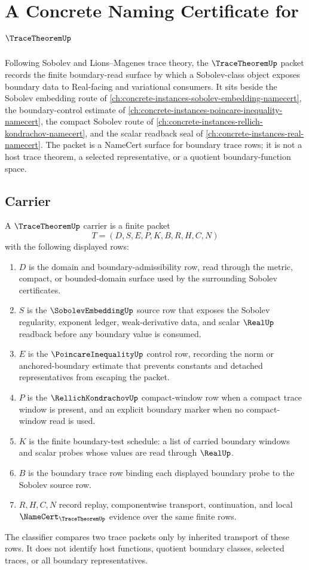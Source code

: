 \chapter{A Concrete Naming Certificate for $\TraceTheoremUp$}
\label{ch:concrete-instances-trace-theorem-namecert}

Following Sobolev and Lions--Magenes trace theory, the $\TraceTheoremUp$ packet records the finite boundary-read surface by which a Sobolev-class object exposes boundary data to Real-facing and variational consumers. It sits beside the Sobolev embedding route of \autoref{ch:concrete-instances-sobolev-embedding-namecert}, the boundary-control estimate of \autoref{ch:concrete-instances-poincare-inequality-namecert}, the compact Sobolev route of \autoref{ch:concrete-instances-rellich-kondrachov-namecert}, and the scalar readback seal of \autoref{ch:concrete-instances-real-namecert}. The packet is a NameCert surface for boundary trace rows; it is not a host trace theorem, a selected representative, or a quotient boundary-function space.

\section{Carrier}
\label{sec:trace-theorem-carrier}

\begin{definition}
\label{def:trace-theorem-carrier}
A $\TraceTheoremUp$ carrier is a finite packet
$$
T=(D,S,E,P,K,B,R,H,C,N)
$$
with the following displayed rows:
\begin{enumerate}
\item $D$ is the domain and boundary-admissibility row, read through the metric, compact, or bounded-domain surface used by the surrounding Sobolev certificates.
\item $S$ is the $\SobolevEmbeddingUp$ source row that exposes the Sobolev regularity, exponent ledger, weak-derivative data, and scalar $\RealUp$ readback before any boundary value is consumed.
\item $E$ is the $\PoincareInequalityUp$ control row, recording the norm or anchored-boundary estimate that prevents constants and detached representatives from escaping the packet.
\item $P$ is the $\RellichKondrachovUp$ compact-window row when a compact trace window is present, and an explicit boundary marker when no compact-window read is used.
\item $K$ is the finite boundary-test schedule: a list of carried boundary windows and scalar probes whose values are read through $\RealUp$.
\item $B$ is the boundary trace row binding each displayed boundary probe to the Sobolev source row.
\item $R,H,C,N$ record replay, componentwise transport, continuation, and local $\NameCert_{\TraceTheoremUp}$ evidence over the same finite rows.
\end{enumerate}
The classifier compares two trace packets only by inherited transport of these rows. It does not identify host functions, quotient boundary classes, selected traces, or all boundary representatives.
\end{definition}

